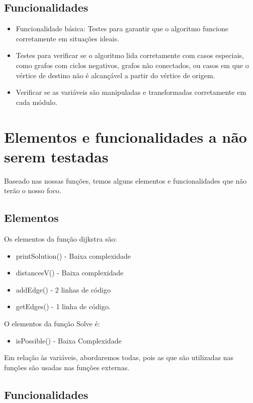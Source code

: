 \documentclass{article}
\begin{document}
\subsection{Funcionalidades}

\begin{itemize}
    \item Funcionalidade básica: Testes para garantir que o algoritmo funcione corretamente em situações ideais.
    \item Testes para verificar se o algoritmo lida corretamente com casos especiais, como grafos com ciclos negativos, grafos não conectados, ou casos em que o vértice de destino não é alcançável a partir do vértice de origem.
    \item Verificar se as variáveis são manipuladas e transformadas corretamente em cada módulo.
\end{itemize}
\section{Elementos e funcionalidades a não serem testadas}
\texttt{}\par Baseado nas nossas funções, temos alguns elementos e funcionalidades que não terão o nosso foco. 
\subsection{Elementos}
\texttt{}\par Os elementos da função dijkstra são:
\begin{itemize}
    \item printSolution() - Baixa complexidade
    \item distancesV() - Baixa complexidade
    \item addEdge() - 2 linhas de código
    \item getEdges() - 1 linha de código.
\end{itemize}

\texttt{}\par O elementos da função Solve é:
\begin{itemize}
    \item isPossible() - Baixa Complexidade
\end{itemize}
\texttt{}\par Em relação às variáveis, abordaremos todas, pois as que são utilizadas nas funções são usadas nas funções externas.

\subsection{Funcionalidades}
\end{document}
